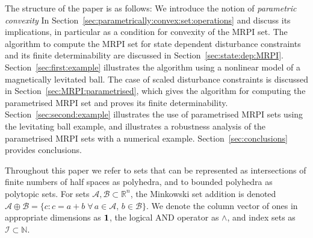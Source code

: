 \documentclass[letterpaper, 10pt, conference]{ieeeconf} %
\begin{document}
The structure of the paper is as follows: We introduce the notion of \emph{parametric convexity} In
Section~\ref{sec:parametrically:convex:set:operations} and discuss its implications, in particular as a condition 
for convexity of the MRPI set. The algorithm to compute the MRPI set for state dependent disturbance
constraints and its finite determinability are discussed in Section~\ref{sec:state:dep:MRPI}.
Section~\ref{sec:first:example} illustrates the algorithm using a nonlinear model of a magnetically 
levitated ball. The case of scaled disturbance constraints is discussed in Section~\ref{sec:MRPI:parametrised},
which gives the algorithm for computing the parametrised MRPI set and
proves its finite determinability. Section~\ref{sec:second:example} illustrates the use of
parametrised MRPI sets using the levitating ball example, and illustrates a robustness analysis of the parametrised
MRPI sets with a numerical example. Section~\ref{sec:conclusions}
provides conclusions.

Throughout this paper we refer to sets that can be represented as intersections of finite numbers of half 
spaces as polyhedra, and to bounded polyhedra as polytopic sets. For sets $\mathcal A, \mathcal B 
\subset\mathbb R^n$, the Minkowski set addition is denoted $\mathcal A\oplus\mathcal B = \{c : c = a + 
b\; \forall\,a\in\mathcal A,\, b\in\mathcal B\}$. We denote the column vector of ones 
in appropriate dimensions as ${\bf{1}}$, the logical AND operator as $\wedge$, and index sets as  $\mathcal I
\subset\mathbb N$. 
%
%
%
\end{document}
